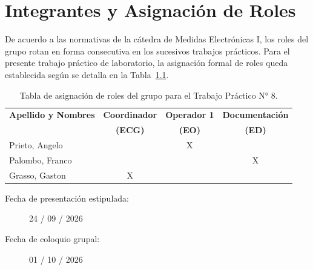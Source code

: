 \chapter{Integrantes y Asignación de Roles}
De acuerdo a las normativas de la cátedra de Medidas Electrónicas I, los roles del grupo rotan en forma consecutiva
en los sucesivos trabajos prácticos. Para el presente trabajo práctico de laboratorio, la asignación formal de roles
queda establecida según se detalla en la Tabla~\ref{tab.roles:tp8}.

\begin{table}[!ht]
    \centering
    \begin{tabular}{|l|c|c|c|}
        \hline
        \textbf{Apellido y Nombres} & \textbf{Coordinador} & \textbf{Operador 1} & \textbf{Documentación} \\
                                    & \textbf{(ECG)}       & \textbf{(EO)}       & \textbf{(ED)} \\ \hline
        Prieto, Angelo & & X & \\ \hline
        Palombo, Franco & & & X \\ \hline
        Grasso, Gaston  & X & & \\ \hline
    \end{tabular}
    \caption{Tabla de asignación de roles del grupo para el Trabajo Práctico N° 8.}
    \label{tab.roles:tp8}
\end{table}

\begin{description}
    \item[Fecha de presentación estipulada:] 24 / 09 / 2026
    \item[Fecha de coloquio grupal:] 01 / 10 / 2026
\end{description}

